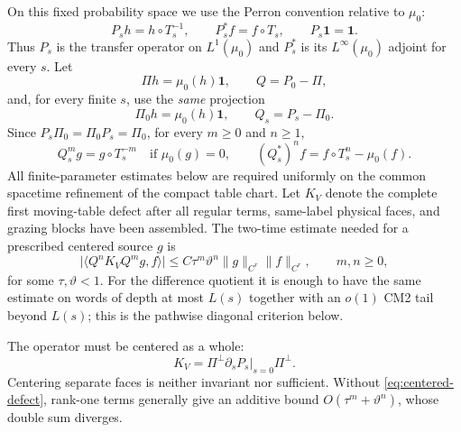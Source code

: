 \documentclass[11pt]{article}
\newcommand{\one}{\mathbf 1}
\begin{document}
On this fixed probability space we use the Perron convention relative to
$\mu_0$:
\begin{equation}
\label{eq:perron-composition-convention}
 P_sh=h\circ T_s^{-1},\qquad P_s^*f=f\circ T_s,\qquad P_s\one=\one.
\end{equation}
Thus $P_s$ is the transfer operator on $L^1(\mu_0)$ and $P_s^*$ is its
$L^\infty(\mu_0)$ adjoint for every $s$.  Let
\[
  \Pi h=\mu_0(h)\one,\qquad Q=P_0-\Pi,
\]
and, for every finite $s$, use the \emph{same} projection
\[
  \Pi_0h=\mu_0(h)\one,\qquad Q_s=P_s-\Pi_0 .
\]
Since $P_s\Pi_0=\Pi_0P_s=\Pi_0$, for every $m\ge0$ and $n\ge1$,
\begin{equation}
\label{eq:centered-endpoint-iterates}
 Q_s^mg=g\circ T_s^{-m}\quad\text{if }\mu_0(g)=0,
 \qquad (Q_s^*)^nf=f\circ T_s^n-\mu_0(f).
\end{equation}
All finite-parameter estimates below are required uniformly on the common
spacetime refinement of the compact table chart.  Let $K_V$ denote the complete first moving-table defect after all regular
terms, same-label physical faces, and grazing blocks have been assembled.  The
two-time estimate needed for a prescribed centered source $g$ is
\begin{equation}
\label{eq:CM2}
 \bigl|\langle Q^nK_VQ^mg,f\rangle\bigr|
 \le C\tau^m\vartheta^n\|g\|_{C^r}\|f\|_{C^r},
 \qquad m,n\ge0,
\end{equation}
for some $\tau,\vartheta<1$.  For the difference quotient it is enough to
have the same estimate on words of depth at most $L(s)$ together with an
$o(1)$ CM2 tail beyond $L(s)$; this is the pathwise diagonal criterion below.

The operator must be centered as a whole:
\begin{equation}
\label{eq:centered-defect}
  K_V=\Pi^\perp\left.\partial_sP_s\right|_{s=0}\Pi^\perp.
\end{equation}
Centering separate faces is neither invariant nor sufficient.  Without
\eqref{eq:centered-defect}, rank-one terms generally give an additive bound
$O(\tau^m+\vartheta^n)$, whose double sum diverges.
\end{document}

